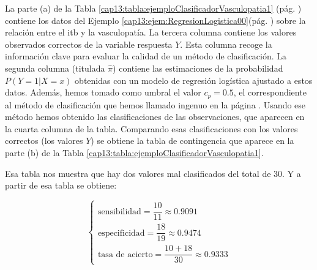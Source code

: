 \begin{Ejemplo}
\label{cap13:ejem:ROC0}
	
La parte (a) de la Tabla \ref{cap13:tabla:ejemploClasificadorVasculopatia1} (pág. \pageref{cap13:tabla:ejemploClasificadorVasculopatia1}) contiene  los datos del Ejemplo \ref{cap13:ejem:RegresionLogistica00}(pág.  \pageref{cap13:ejem:RegresionLogistica00}) sobre la relación entre el itb y la vasculopatía. La tercera columna contiene los valores observados correctos de la variable respuesta $Y$. Esta columna recoge la información clave para  evaluar la calidad de un método de clasificación. La segunda columna (titulada $\hat{\pi}$) contiene las estimaciones  de la probabilidad $ P(Y=1|X=x)$ obtenidas con un modelo de  regresión logística ajustado a estos datos.  Además, hemos tomado como umbral el valor $c_p=0.5$, el correspondiente al método de clasificación que hemos llamado ingenuo en la página \pageref{cap13:subsubsec:MetodoIngenuoClasificacion}. Usando ese método hemos obtenido las clasificaciones de las  observaciones, que aparecen en la cuarta columna de la tabla. Comparando esas clasificaciones con los valores correctos (los valores $Y$) se obtiene la tabla de contingencia que aparece en la parte (b) de la Tabla \ref{cap13:tabla:ejemploClasificadorVasculopatia1}.

Esa tabla nos muestra que hay dos valores mal clasificados del total de $30$. Y a partir de esa tabla se obtiene:

\[
\begin{cases}
\mbox{sensibilidad} = \dfrac{10}{11}\approx 0.9091\\[5mm]
\mbox{especificidad} = \dfrac{18}{19}\approx 0.9474\\[5mm]
\mbox{tasa de acierto} = \dfrac{10 + 18}{30}\approx 0.9333
\end{cases}
\]


\end{Ejemplo}
